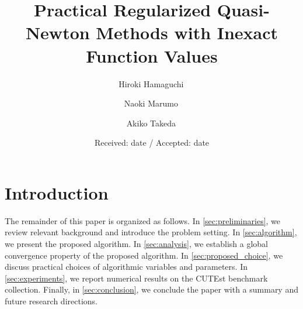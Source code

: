 \documentclass[smallextended]{svjour3}       %
\begin{document}
\title{Practical Regularized Quasi-Newton Methods with Inexact Function Values}

\author{
    Hiroki Hamaguchi\, \and
    Naoki Marumo\, \and
    Akiko Takeda\,
}


\date{Received: date / Accepted: date}

\maketitle

\begin{abstract}
    

\end{abstract}

\section{Introduction}\label{sec:introduction}



The remainder of this paper is organized as follows.
In \cref{sec:preliminaries}, we review relevant background and introduce the problem setting.
In \cref{sec:algorithm}, we present the proposed algorithm.
In \cref{sec:analysis}, we establish a global convergence property of the proposed algorithm.
In \cref{sec:proposed_choice}, we discuss practical choices of algorithmic variables and parameters.
In \cref{sec:experiments}, we report numerical results on the CUTEst benchmark collection.
Finally, in \cref{sec:conclusion}, we conclude the paper with a summary and future research directions.
\end{document}

